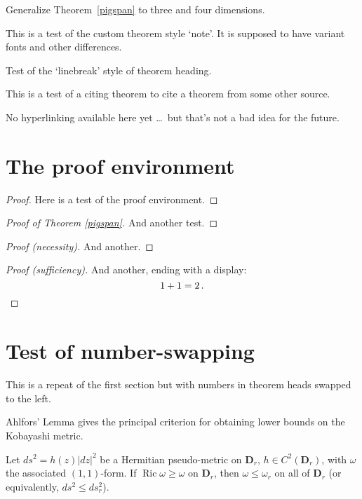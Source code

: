 \documentclass{article}
\let\lvert=|\let\rvert=|
\newcommand{\Ric}{\mathop{\mathrm{Ric}}\nolimits}
\begin{document}
\begin{exer}
Generalize Theorem~\ref{pigspan} to three and four dimensions.
\end{exer}

\begin{note}
This is a test of the custom theorem style `note'. It is supposed to have
variant fonts and other differences.
\end{note}

\begin{bthm}
Test of the `linebreak' style of theorem heading.
\end{bthm}

This is a test of a citing theorem to cite a theorem from some other source.

\begin{varthm}
No hyperlinking available here yet \dots\ but that's not a
bad idea for the future.
\end{varthm}

\section{The proof environment}

\begin{proof}
Here is a test of the proof environment.
\end{proof}

\begin{proof}[Proof of Theorem \ref{pigspan}]
And another test.
\end{proof}

\begin{proof}[Proof \textup(necessity\textup)]
And another.
\end{proof}

\begin{proof}[Proof \textup(sufficiency\textup)]
And another, ending with a display:
\[
1+1=2\,. \qedhere
\]
\end{proof}

\section{Test of number-swapping}

This is a repeat of the first section but with numbers in theorem heads
swapped to the left.

Ahlfors' Lemma gives the principal criterion for obtaining lower bounds
on the Kobayashi metric.
\begin{Ahlfors}
Let $ds^2 = h(z)\lvert dz\rvert^2$ be a Hermitian pseudo-metric on
$\mathbf{D}_r$, $h\in C^2(\mathbf{D}_r)$, with $\omega$ the associated
$(1,1)$-form. If $\Ric\omega\geq\omega$ on $\mathbf{D}_r$,
then $\omega\leq\omega_r$ on all of $\mathbf{D}_r$ (or equivalently,
$ds^2\leq ds_r^2$).
\end{Ahlfors}
\end{document}
